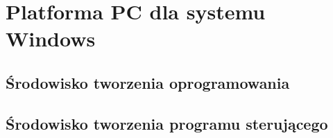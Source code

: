 \section{Platforma PC dla systemu Windows}
\subsection{Środowisko tworzenia oprogramowania}
\subsection{Środowisko tworzenia programu sterującego}